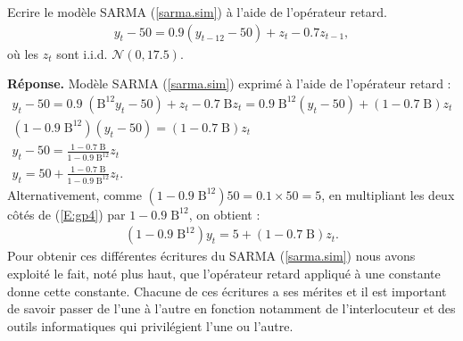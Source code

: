\documentclass{article}
\def\bm{\mbox{B}}
\def\nor{\mathcal{N}}
\begin{document}
\begin{Exercice} 
Ecrire
le mod\`ele SARMA (\ref{sarma.sim}) \`a l'aide de l'op\'erateur retard.
\begin{eqnarray} \label{sarma.sim}
y_t - 50 = 0.9 (y_{t-12}-50) + z_t - 0.7 z_{t-1},
\end{eqnarray}
o\`u les $z_t$ sont i.i.d. $\nor(0,17.5)$.

\end{Exercice}
\textbf{R\'eponse.}
Mod\`ele SARMA (\ref{sarma.sim}) exprim\'e \`a l'aide de l'op\'erateur retard :
\begin{subequations} \label{E:gp}
  \begin{gather}
   y_t - 50 =  0.9 \;(\bm^{12} y_t-50) + z_t - 0.7\; \bm z_t =  0.9\; \bm^{12}( y_t-50) + (1 - 0.7 \; \bm) z_t\label{E:gp1} \\
   ( 1 - 0.9 \; \bm^{12} ) (y_t - 50)  = (1 - 0.7 \;\bm) z_t \label{E:gp2} \\
   y_t - 50  = \frac{ 1 - 0.7\; \bm}{1 - 0.9 \;\bm^{12}} z_t \label{E:gp3}\\
   y_t   = 50 + \frac{ 1 - 0.7\; \bm}{1 - 0.9 \;\bm^{12}} z_t.  \label{E:gp4}
  \end{gather}
\end{subequations}
Alternativement, comme $( 1 - 0.9 \; \bm^{12} ) 50 = 0.1\times 50 = 5$,  en multipliant les deux c\^ot\'es de
(\ref{E:gp4}) par $1 - 0.9 \;\bm^{12} $, on obtient :
\begin{eqnarray} \label{Egp}
 ( 1 - 0.9 \; \bm^{12} ) y_t    = 5 + (1 - 0.7 \;\bm) z_t.
 \end{eqnarray}
Pour obtenir ces diff\'erentes \'ecritures du SARMA (\ref{sarma.sim}) nous avons exploit\'e le fait, not\'e plus haut, que l'op\'erateur
retard appliqu\'e \`a une constante donne cette constante.
Chacune de ces \'ecritures a ses m\'erites et il est important de savoir passer de l'une \`a l'autre en fonction notamment
de l'interlocuteur et des outils informatiques qui privil\'egient l'une ou l'autre.
\end{document}
